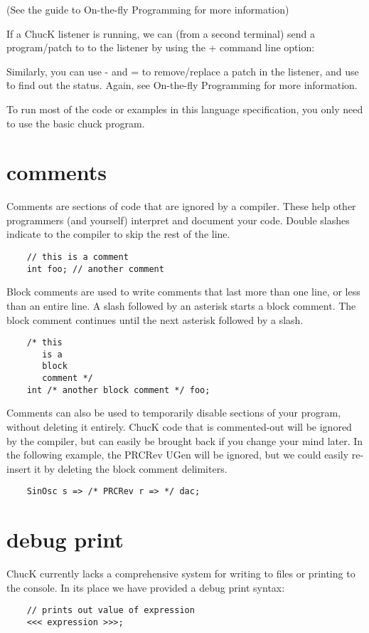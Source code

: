 (See the guide to On-the-fly Programming for more information)

If a ChucK listener is running, we can (from a second terminal) send a program/patch to to the listener by using the + command line option:

Similarly, you can use - and = to remove/replace a patch in the listener, and use \^ to find out the status. Again, see On-the-fly Programming for more information.

To run most of the code or examples in this language specification, you only need to use the basic chuck program.
 

\section{comments}

Comments are sections of code that are ignored by a compiler. These help other programmers (and yourself) interpret and document your code. Double slashes indicate to the compiler to skip the rest of the line. 
\begin{verbatim}
    // this is a comment
    int foo; // another comment
\end{verbatim}
Block comments are used to write comments that last more than one line, or less than an entire line. A slash followed by an asterisk starts a block comment. The block comment continues until the next asterisk followed by a slash. 
\begin{verbatim}
    /* this 
       is a
       block
       comment */
    int /* another block comment */ foo;
\end{verbatim}
Comments can also be used to temporarily disable sections of your program, without deleting it entirely. ChucK code that is commented-out will be ignored by the compiler, but can easily be brought back if you change your mind later. In the following example, the PRCRev UGen will be ignored, but we could easily re-insert it by deleting the block comment delimiters. 
\begin{verbatim}
    SinOsc s => /* PRCRev r => */ dac;
\end{verbatim}

\section{debug print}

ChucK currently lacks a comprehensive system for writing to files or printing to the console. In its place we have provided a debug print syntax:
\begin{verbatim}
    // prints out value of expression
    <<< expression >>>;
\end{verbatim}

